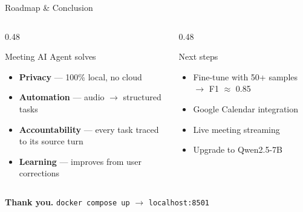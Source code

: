 \documentclass[aspectratio=169]{beamer}
\begin{document}
\begin{frame}{Roadmap \& Conclusion}
  \begin{columns}[T,onlytextwidth]
    \begin{column}{0.48\textwidth}
      \begin{block}{Meeting AI Agent solves}
        \begin{itemize}
          \item \textbf{Privacy} --- 100\% local, no cloud
          \item \textbf{Automation} --- audio $\rightarrow$ structured tasks
          \item \textbf{Accountability} --- every task traced to its source turn
          \item \textbf{Learning} --- improves from user corrections
        \end{itemize}
      \end{block}
    \end{column}
    \begin{column}{0.48\textwidth}
      \begin{block}{Next steps}
        \begin{itemize}
          \item Fine-tune with 50+ samples $\rightarrow$ F1 $\approx$ 0.85
          \item Google Calendar integration
          \item Live meeting streaming
          \item Upgrade to Qwen2.5-7B
        \end{itemize}
      \end{block}
    \end{column}
  \end{columns}
  \vspace{0.8em}
  \centering
  \Large\textbf{Thank you.}\normalsize\quad
  \small\texttt{docker compose up} $\rightarrow$ \texttt{localhost:8501}
\end{frame}
\end{document}
